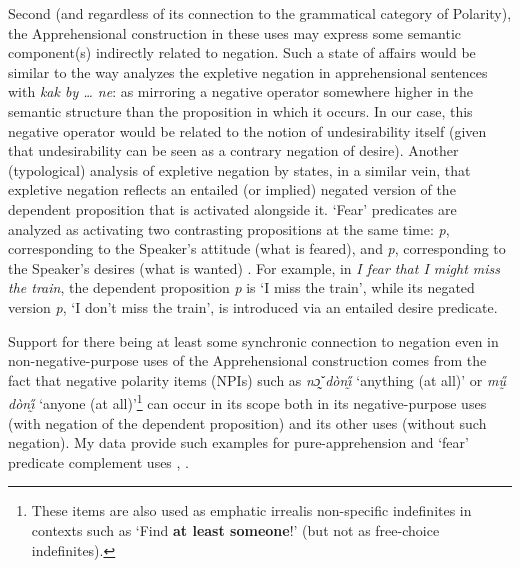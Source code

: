 \documentclass[output=paper,colorlinks,citecolor=brown]{langscibook}
\begin{document}
Second (and regardless of its connection to the grammatical category of Polarity), the Apprehensional construction in these uses may express some semantic component(s) indirectly related to negation. Such a state of affairs would be similar to the way \citet{abels2005} analyzes the expletive negation in  apprehensional sentences with \textit{kak by {\dots} ne}: as mirroring a negative operator somewhere higher in the semantic structure than the proposition in which it occurs. In our case, this negative operator would be related to the notion of undesirability itself (given that undesirability can be seen as a contrary negation of desire). Another (typological) analysis of expletive negation by \citet{jinkoenig2020} states, in a similar vein, that expletive negation reflects an entailed (or implied) negated version of the dependent proposition that is activated alongside it. `Fear' predicates are analyzed as activating two contrasting propositions at the same time: \textit{p}, corresponding to the Speaker's attitude (what is feared), and \neg \textit{p}, corresponding to the Speaker's desires (what is wanted) \citep[22]{jinkoenig2020}. For example, in \textit{I fear that I might miss the train}, the dependent proposition \textit{p} is `I miss the train', while its negated version \neg \textit{p}, `I don't miss the train', is introduced via an entailed desire predicate.

Support for there being at least some synchronic connection to negation even in non-negative-purpose uses of the Apprehensional construction comes from the fact that  negative polarity items (NPIs) such as \textit{nɔ̰̌ dònı̰̋} `anything (at all)' or \textit{mṵ̋ dònı̰̋} `anyone (at all)'\footnote{These items are also used as emphatic irrealis non-specific indefinites in contexts such as `Find \textbf{at least someone}!' (but not as free-choice indefinites).} can occur in its scope both in its negative-purpose uses  (with negation of the dependent proposition) and its other uses (without such negation). My data provide such examples for pure-apprehension  and `fear' predicate complement uses , .

\z
\end{document}
